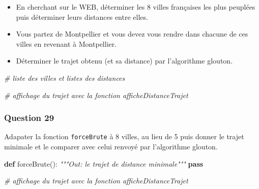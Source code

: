 \documentclass[
  paper=a4,
  ,captions=tableheading
]{scrartcl}
\newenvironment{Shaded}{}{}
\newcommand{\CommentTok}[1]{\textcolor[rgb]{0.38,0.63,0.69}{\textit{#1}}}
\newcommand{\ControlFlowTok}[1]{\textcolor[rgb]{0.00,0.44,0.13}{\textbf{#1}}}
\newcommand{\KeywordTok}[1]{\textcolor[rgb]{0.00,0.44,0.13}{\textbf{#1}}}
\newcommand{\NormalTok}[1]{#1}
\begin{document}
\begin{itemize}
\item
  En cherchant sur le WEB, déterminer les 8 villes françaises les plus
  peuplées puis déterminer leurs distances entre elles.
\item
  Vous partez de Montpellier et vous devez vous rendre dans chacune de
  ces villes en revenant à Montpellier.
\item
  Déterminer le trajet obtenu (et sa distance) par l'algorithme glouton.
\end{itemize}

\begin{Shaded}
\begin{Highlighting}[]
\CommentTok{\# liste des villes et listes des distances}
\end{Highlighting}
\end{Shaded}

\begin{Shaded}
\begin{Highlighting}[]
\CommentTok{\# affichage du trajet avec la fonction afficheDistanceTrajet}
\end{Highlighting}
\end{Shaded}

\hypertarget{question-29}{%
\subsubsection{Question 29}\label{question-29}}

Adapater la fonction \texttt{forceBrute} à 8 villes, au lieu de 5 puis
donner le trajet minimale et le comparer avec celui renvoyé par
l'algorithme glouton.

\begin{Shaded}
\begin{Highlighting}[]
\KeywordTok{def}\NormalTok{ forceBrute():}
    \CommentTok{"""Out: le trajet de distance minimale"""}
    \ControlFlowTok{pass}
\end{Highlighting}
\end{Shaded}

\begin{Shaded}
\begin{Highlighting}[]
\CommentTok{\# affichage du trajet avec la fonction afficheDistanceTrajet}
\end{Highlighting}
\end{Shaded}

\begin{Shaded}
\begin{Highlighting}[]

\end{Highlighting}
\end{Shaded}
\end{document}
